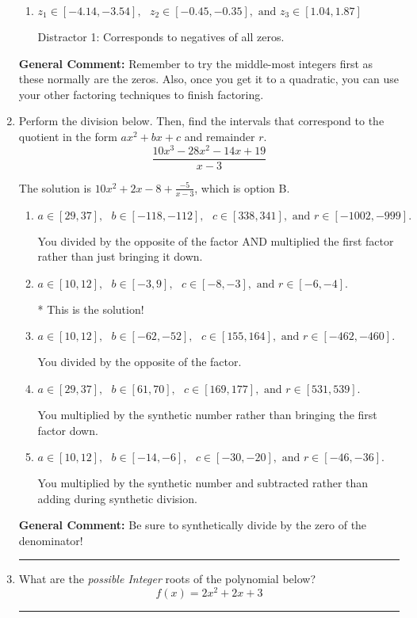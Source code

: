 \documentclass{extbook}[14pt]
\newcommand{\litem}[1]{\item #1

\rule{\textwidth}{0.4pt}}
\begin{document}
\begin{enumerate}
{\begin{enumerate}[label=\Alph*.]
 Distractor 2: Corresponds to inversing rational roots.
\item \( z_1 \in [-4.14, -3.54], \text{   }  z_2 \in [-0.45, -0.35], \text{   and   } z_3 \in [1.04, 1.87] \)

 Distractor 1: Corresponds to negatives of all zeros.
\end{enumerate}

\textbf{General Comment:} Remember to try the middle-most integers first as these normally are the zeros. Also, once you get it to a quadratic, you can use your other factoring techniques to finish factoring.
}
\litem{
Perform the division below. Then, find the intervals that correspond to the quotient in the form $ax^2+bx+c$ and remainder $r$.
\[ \frac{10x^{3} -28 x^{2} -14 x + 19}{x -3} \]

The solution is \( 10x^{2} +2 x -8 + \frac{-5}{x -3} \), which is option B.\begin{enumerate}[label=\Alph*.]
\item \( a \in [29, 37], \text{   } b \in [-118, -112], \text{   } c \in [338, 341], \text{   and   } r \in [-1002, -999]. \)

 You divided by the opposite of the factor AND multiplied the first factor rather than just bringing it down.
\item \( a \in [10, 12], \text{   } b \in [-3, 9], \text{   } c \in [-8, -3], \text{   and   } r \in [-6, -4]. \)

* This is the solution!
\item \( a \in [10, 12], \text{   } b \in [-62, -52], \text{   } c \in [155, 164], \text{   and   } r \in [-462, -460]. \)

 You divided by the opposite of the factor.
\item \( a \in [29, 37], \text{   } b \in [61, 70], \text{   } c \in [169, 177], \text{   and   } r \in [531, 539]. \)

 You multiplied by the synthetic number rather than bringing the first factor down.
\item \( a \in [10, 12], \text{   } b \in [-14, -6], \text{   } c \in [-30, -20], \text{   and   } r \in [-46, -36]. \)

 You multiplied by the synthetic number and subtracted rather than adding during synthetic division.
\end{enumerate}

\textbf{General Comment:} Be sure to synthetically divide by the zero of the denominator!
}
\litem{
What are the \textit{possible Integer} roots of the polynomial below?
\[ f(x) = 2x^{2} +2 x + 3 \]

}
\end{enumerate}
\end{document}
